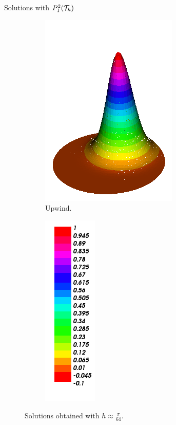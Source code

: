 \begin{frame}{Solutions with $\relax{P}_1^2(\mathcal{T}_h)$}
\begin{figure}[h!]
\begin{subfigure}[b]{0.27\textwidth}
				\centering
				\includegraphics[scale=0.22]{img/Conveccion_Reaccion/Recortes/steady_convect_react_approx_UPW_n_128.png}
				\caption{Upwind.}
			\end{subfigure}
			\begin{subfigure}[b]{0.15\textwidth}
				\centering
				\includegraphics[scale=0.22]{img/Conveccion_Reaccion/Recortes/steady_convect_react_values.png}
			\end{subfigure}
			\caption{Solutions obtained with $h\approx\frac{\pi}{64}$.}
		\end{figure}
		\vspace{-0.7cm}
		\begin{figure}[h!]
			\begin{subfigure}[b]{0.27\textwidth}
				\centering

\end{subfigure}
\end{figure}
\end{frame}

